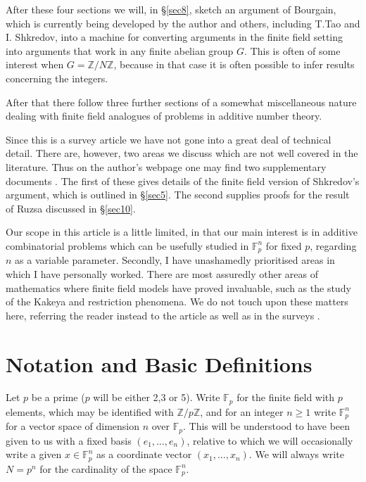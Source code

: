 \documentclass[12pt,a4paper,reqno]{amsart}
\numberwithin{equation}{section}
\theoremstyle{plain}
\theoremstyle{definition}
\renewcommand{\geq}{\geqslant}
\begin{document}
\noindent After these four sections we will, in \S \ref{sec8}, sketch an argument of Bourgain, which is currently being developed by the author and others, including T.Tao and I. Shkredov, into a machine for converting arguments in the finite field setting into arguments that work in any finite abelian group $G$. This is often of some interest when $G = \mathbb{Z}/N\mathbb{Z}$, because in that case it is often possible to infer results concerning the integers. \vspace{11pt}

\noindent After that there follow three further sections of a somewhat miscellaneous nature dealing with finite field analogues of problems in additive number theory.\vspace{11pt}

\noindent Since this is a survey article we have not gone into a great deal of technical detail. There are, however, two areas we discuss which are not well covered in the literature. Thus on the author's webpage one may find two supplementary documents \cite{sup-doc-1, sup-doc-2}. The first of these gives details of the finite field version of Shkredov's argument, which is outlined in \S \ref{sec5}. The second supplies proofs for the result of Ruzsa discussed in \S \ref{sec10}.\vspace{11pt}

\noindent Our scope in this article is a little limited, in that our main interest is in additive combinatorial problems which can be usefully studied in $\mathbb{F}_p^n$ for fixed $p$, regarding $n$ as a variable parameter. Secondly, I have unashamedly prioritised areas in which I have personally worked. There are most assuredly other areas of mathematics where finite field models have proved invaluable, such as the study of the Kakeya and restriction phenomena. We do not touch upon these matters here, referring the reader instead to the article \cite{mockenhaupt-tao} as well as in the surveys \cite{katz-tao-survey, tao-survey1, tao-survey2}.


\section{Notation and Basic Definitions}\label{sec2}
\noindent Let $p$ be a prime ($p$ will be either 2,3 or 5). Write $\mathbb{F}_p$ for the finite field with $p$ elements, which may be identified with $\mathbb{Z}/p\mathbb{Z}$, and for an integer $n \geq 1$ write $\mathbb{F}_p^n$ for a vector space of dimension $n$ over $\mathbb{F}_p$. This will be understood to have been given to us with a fixed basis $(e_1,\dots,e_n)$, relative to which we will occasionally write a given $x \in \mathbb{F}_p^n$ as a coordinate vector $(x_1,\dots,x_n)$. We will always write $N = p^n$ for the cardinality of the space $\mathbb{F}_p^n$.\vspace{11pt}
\end{document}
